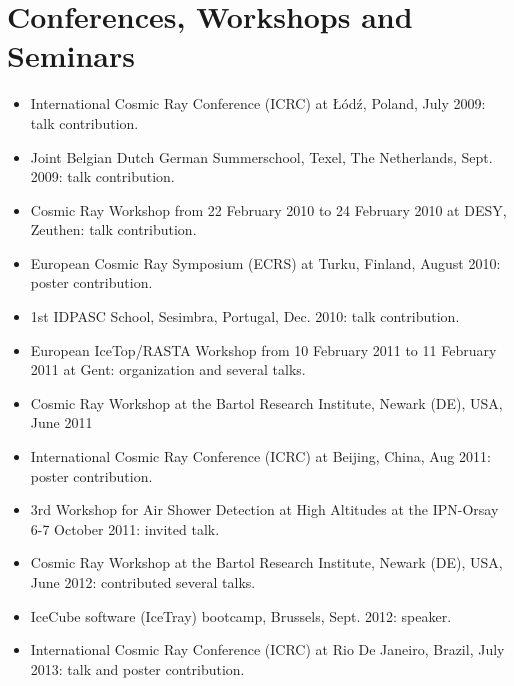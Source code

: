 \documentclass[11pt,a4paper,oneside,fleqn]{article}
\begin{document}
{\section{Conferences, Workshops and Seminars}
\begin{itemize}
\item International Cosmic Ray Conference (ICRC) at \L\'{o}d\'{z}, Poland, July 2009: talk contribution.
\item Joint Belgian Dutch German Summerschool, Texel, The Netherlands, Sept. 2009: talk contribution.
\item Cosmic Ray Workshop from 22 February 2010 to 24 February 2010 at DESY, Zeuthen: talk contribution.
\item European Cosmic Ray Symposium (ECRS) at Turku, Finland, August 2010: poster contribution.
\item 1st IDPASC School, Sesimbra, Portugal, Dec. 2010: talk contribution.
\item European IceTop/RASTA Workshop from 10 February 2011 to 11 February 2011 at Gent: organization and several talks.
\item Cosmic Ray Workshop at the Bartol Research Institute, Newark (DE), USA, June 2011
\item International Cosmic Ray Conference (ICRC) at Beijing, China, Aug 2011: poster contribution.
\item 3rd Workshop for Air Shower Detection at High Altitudes at the IPN-Orsay 6-7 October 2011: invited talk.
\item Cosmic Ray Workshop at the Bartol Research Institute, Newark (DE), USA, June 2012: contributed several talks.
\item IceCube software (IceTray) bootcamp, Brussels, Sept. 2012: speaker. %
\item International Cosmic Ray Conference (ICRC) at Rio De Janeiro, Brazil, July 2013: talk and poster contribution. 


\end{itemize}}
\end{document}
